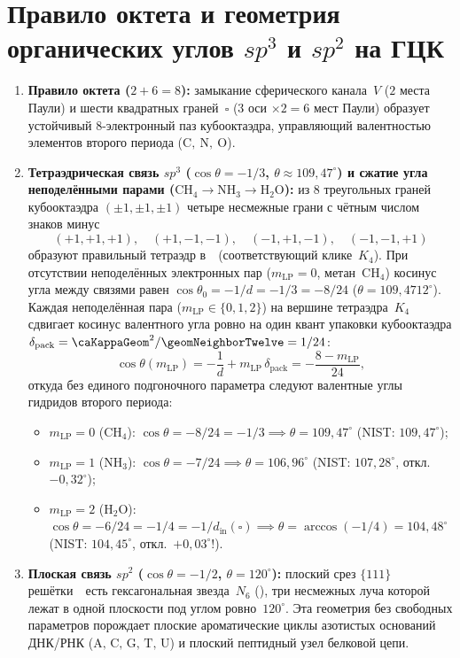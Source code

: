 \section{Правило октета и геометрия органических углов \texorpdfstring{$sp^3$}{sp3} и \texorpdfstring{$sp^2$}{sp2} на ГЦК}
\label{sec:chem-octet-hybridization}

\begin{enumerate}[leftmargin=*]
\item \textbf{Правило октета ($2+6=8$):}
  замыкание сферического канала~$V$ ($2$ места Паули) и шести квадратных граней~$\square$ ($3$ оси $\times 2=6$ мест Паули)
  образует устойчивый $8$-электронный паз кубооктаэдра, управляющий валентностью элементов второго периода
  ($\text{C},\ \text{N},\ \text{O}$).
\item \textbf{Тетраэдрическая связь $sp^3$ ($\cos\theta=-1/3$, $\theta\approx 109{,}47^\circ$) и сжатие угла неподелёнными парами ($\text{CH}_4\to\text{NH}_3\to\text{H}_2\text{O}$):}
  из $8$ треугольных граней кубооктаэдра $(\pm 1,\pm 1,\pm 1)$ четыре несмежные грани с чётным числом знаков минус
  \[
    (+1,+1,+1),\quad (+1,-1,-1),\quad (-1,+1,-1),\quad (-1,-1,+1)
  \]
  образуют правильный тетраэдр в~\latGCKshort\ (соответствующий клике~$K_4$).
  При отсутствии неподелённых электронных пар ($m_{\mathrm{LP}}=0$, метан~$\text{CH}_4$) косинус угла между связями равен $\cos\theta_0=-1/d=-1/3=-8/24$ ($\theta=109{,}4712^\circ$).
  Каждая неподелённая пара ($m_{\mathrm{LP}}\in\{0,1,2\}$) на вершине тетраэдра~$K_4$ сдвигает косинус валентного угла ровно на один квант упаковки кубооктаэдра $\delta_{\mathrm{pack}}=\caKappaGeom^2/\geomNeighborTwelve=1/24$:
  \begin{equation}
  \label{eq:chem-lone-pair-angle}
    \cos\theta(m_{\mathrm{LP}})
    = -\frac{1}{d} + m_{\mathrm{LP}}\,\delta_{\mathrm{pack}}
    = -\frac{8 - m_{\mathrm{LP}}}{24},
  \end{equation}
  откуда без единого подгоночного параметра следуют валентные углы гидридов второго периода:
  \begin{itemize}[noitemsep]
  \item $m_{\mathrm{LP}}=0$ ($\text{CH}_4$): $\cos\theta=-8/24=-1/3 \implies \theta=109{,}47^\circ$ (NIST: $109{,}47^\circ$);
  \item $m_{\mathrm{LP}}=1$ ($\text{NH}_3$): $\cos\theta=-7/24 \implies \theta=106{,}96^\circ$ (NIST: $107{,}28^\circ$, откл.\ $-0{,}32^\circ$);
  \item $m_{\mathrm{LP}}=2$ ($\text{H}_2\text{O}$): $\cos\theta=-6/24=-1/4=-1/d_{\mathrm{in}}(\square) \implies \theta=\arccos(-1/4)=104{,}48^\circ$ (NIST: $104{,}45^\circ$, откл.\ $+0{,}03^\circ$!).
  \end{itemize}
\item \textbf{Плоская связь $sp^2$ ($\cos\theta=-1/2$, $\theta=120^\circ$):}
  плоский срез $\{111\}$ решётки~\latGCKshort\ есть гексагональная звезда~$N_6$ (),
  три несмежных луча которой лежат в одной плоскости под углом ровно~$120^\circ$.
  Эта геометрия без свободных параметров порождает плоские ароматические циклы азотистых оснований ДНК/РНК
  ($\text{A, C, G, T, U}$) и плоский пептидный узел белковой цепи.
\end{enumerate}

